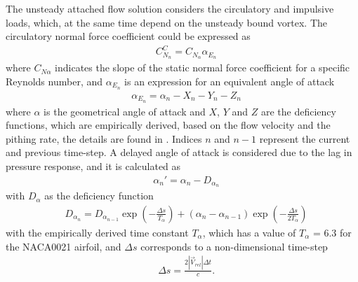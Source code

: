 \documentclass[a4paper]{jpconf}
\begin{document}
The unsteady attached flow solution considers the circulatory and impulsive loads, which, at the same time depend on the unsteady bound vortex. The circulatory normal force coefficient could be expressed as
\begin{align}
& C_{N_n}^C = C_{N_\alpha} \alpha_{E_n}	\label{CNcirc}
\end{align}
where $C_{N \alpha}$ indicates the slope of the static normal force coefficient for a specific Reynolds number, and $\alpha_{E_n}$ is an expression for an equivalent angle of attack
\begin{align}
& \alpha_{E_n} = \alpha_n - X_n -Y_n - Z_n	\label{alphaeq}
\end{align}
where $\alpha$ is the geometrical angle of attack and $X$, $Y$ and $Z$ are the deficiency functions, which are empirically derived, based on the flow velocity and the pithing rate, the details are found in \cite{dyachuk2013dynamic}. Indices $n$ and $n-1$ represent the current and previous time-step. A delayed angle of attack is considered due to the lag in pressure response, and it is calculated as
\begin{align}
& {\alpha _n}' = {\alpha _n} - D_{\alpha _n}    	\label{alphadel}
\end{align}
with $D_\alpha$ as the deficiency function
\begin{align}
& D_{\alpha_n} = D_{\alpha_{n-1}} \exp \left( - \frac{\Delta s}{T_\alpha} \right) + (\alpha_n - \alpha_{n-1})\exp \left( - \frac{\Delta s}{2T_\alpha} \right) \label{defalpha}
\end{align}
with the empirically derived time constant $T_\alpha$, which has a value of $T_\alpha$ = 6.3 for the NACA0021 airfoil, and $\Delta s$ corresponds to a non-dimensional time-step
\begin{align}
& \Delta s = \frac{2 | \vec{V}_{rel} | \Delta t}{c}		.	\label{deltas}
\end{align}
\end{document}
